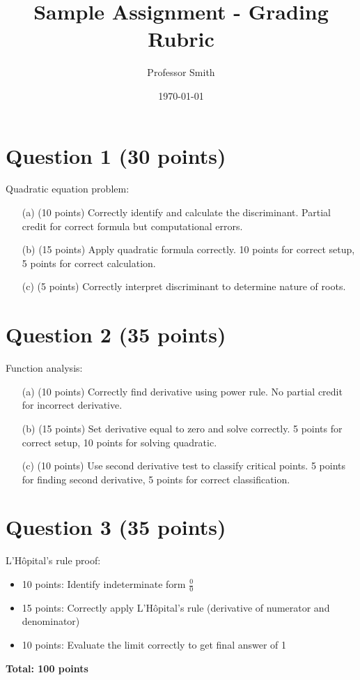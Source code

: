 \documentclass{article}
\title{Sample Assignment - Grading Rubric}
\author{Professor Smith}
\date{\today}
\begin{document}
\maketitle

\section{Question 1 (30 points)}
Quadratic equation problem:

\begin{enumerate}
    \item[(a)] (10 points) Correctly identify and calculate the discriminant. Partial credit for correct formula but computational errors.
    \item[(b)] (15 points) Apply quadratic formula correctly. 10 points for correct setup, 5 points for correct calculation.
    \item[(c)] (5 points) Correctly interpret discriminant to determine nature of roots.
\end{enumerate}

\section{Question 2 (35 points)}
Function analysis:

\begin{enumerate}
    \item[(a)] (10 points) Correctly find derivative using power rule. No partial credit for incorrect derivative.
    \item[(b)] (15 points) Set derivative equal to zero and solve correctly. 5 points for correct setup, 10 points for solving quadratic.
    \item[(c)] (10 points) Use second derivative test to classify critical points. 5 points for finding second derivative, 5 points for correct classification.
\end{enumerate}

\section{Question 3 (35 points)}
L'Hôpital's rule proof:

\begin{itemize}
    \item 10 points: Identify indeterminate form $\frac{0}{0}$
    \item 15 points: Correctly apply L'Hôpital's rule (derivative of numerator and denominator)
    \item 10 points: Evaluate the limit correctly to get final answer of 1
\end{itemize}

\textbf{Total: 100 points}
\end{document}
